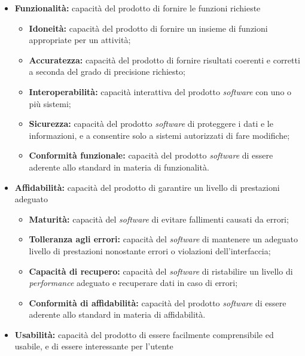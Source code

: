 \begin{itemize}
	\item \textbf{Funzionalità:} capacità del prodotto di fornire le funzioni richieste
	\begin{itemize}
		\item \textbf{Idoneità:} capacità del prodotto di fornire un insieme di funzioni appropriate per un attività;
		\item \textbf{Accuratezza:} capacità del prodotto di fornire risultati 
		coerenti e corretti a seconda del grado di precisione richiesto;
		\item \textbf{Interoperabilità:} capacità interattiva del prodotto 
		\textit{software} con uno o più sistemi;
		\item \textbf{Sicurezza:} capacità del prodotto \textit{software} di 
		proteggere i dati e le informazioni, e a consentire solo a sistemi 
		autorizzati di fare modifiche;
		\item \textbf{Conformità funzionale:} capacità del prodotto 
		\textit{software} di essere aderente allo standard in materia di 
		funzionalità.
	\end{itemize} 
	
	\item \textbf{Affidabilità:} capacità del prodotto di garantire un livello di prestazioni adeguato
	\begin{itemize}
		\item \textbf{Maturità:} capacità del \textit{software} di evitare 
		fallimenti causati da errori;
		\item \textbf{Tolleranza agli errori:} capacità del \textit{software} 
		di mantenere un adeguato livello di prestazioni nonostante errori o 
		violazioni dell'interfaccia;
		\item \textbf{Capacità di recupero:} capacità del \textit{software} di 
		ristabilire un livello di \textit{performance} adeguato e recuperare 
		dati in caso di errori;
		\item \textbf{Conformità di affidabilità:} capacità del prodotto 
		\textit{software} di essere aderente allo standard in materia di 
		affidabilità.
	\end{itemize}
	
	\item \textbf{Usabilità:} capacità del prodotto di essere facilmente comprensibile ed usabile, e di essere interessante per l'utente
	

\end{itemize}
